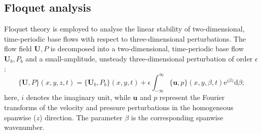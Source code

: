 \subsection{Floquet analysis}

Floquet theory is employed to analyse the linear stability of two-dimensional, time-periodic base flows with respect to three-dimensional perturbations. The flow field ${\boldsymbol{U}, P}$ is decomposed into a two-dimensional, time-periodic base flow ${\boldsymbol{U}_b, P_b}$ and a small-amplitude, unsteady three-dimensional perturbation of order $\epsilon$:
%
\begin{equation}
\{\bm{U},P\}(x,y,z,t) = \{\bm{U}_b,P_b\}(x,y,t) + \epsilon \int_{-\infty}^{\infty} \{\bm{u},p\}(x,y,\beta,t) \text{e}^{i \beta z} \text{d} \beta;
\end{equation}
%
here, $i$ denotes the imaginary unit, while $\boldsymbol{u}$ and $p$ represent the Fourier transforms of the velocity and pressure perturbations in the homogeneous spanwise ($z$) direction. The parameter $\beta$ is the corresponding spanwise wavenumber.

